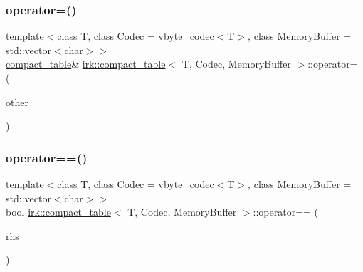 \subsubsection{\texorpdfstring{operator=()}{operator=()}\hspace{0.1cm}{\footnotesize\ttfamily [2/2]}}
{\footnotesize\ttfamily template$<$class T, class Codec = vbyte\+\_\+codec$<$\+T$>$, class Memory\+Buffer = std\+::vector$<$char$>$$>$ \\
\mbox{\hyperlink{classirk_1_1compact__table}{compact\+\_\+table}}\& \mbox{\hyperlink{classirk_1_1compact__table}{irk\+::compact\+\_\+table}}$<$ T, Codec, Memory\+Buffer $>$\+::operator= (\begin{DoxyParamCaption}\item[{const \mbox{\hyperlink{classirk_1_1compact__table}{compact\+\_\+table}}$<$ T, Codec, Memory\+Buffer $>$ \&}]{other }\end{DoxyParamCaption})\hspace{0.3cm}{\ttfamily [default]}}

\mbox{\label{classirk_1_1compact__table_ab0fbc092d98001d97e8ec78e24f4040d}} 
\subsubsection{\texorpdfstring{operator==()}{operator==()}}
{\footnotesize\ttfamily template$<$class T, class Codec = vbyte\+\_\+codec$<$\+T$>$, class Memory\+Buffer = std\+::vector$<$char$>$$>$ \\
bool \mbox{\hyperlink{classirk_1_1compact__table}{irk\+::compact\+\_\+table}}$<$ T, Codec, Memory\+Buffer $>$\+::operator== (\begin{DoxyParamCaption}\item[{const \mbox{\hyperlink{classirk_1_1compact__table}{compact\+\_\+table}}$<$ T, Codec $>$ \&}]{rhs }\end{DoxyParamCaption})\hspace{0.3cm}{\ttfamily [inline]}}

\mbox{\label{classirk_1_1compact__table_acdcdce1447487c4ab98dbe370b6e394f}} 
